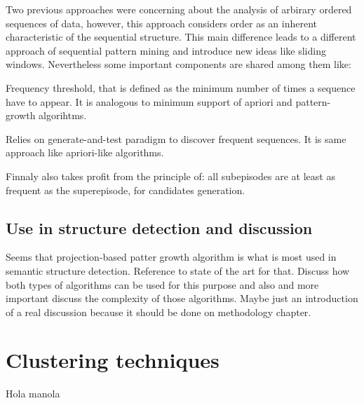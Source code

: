 Two previous approaches were concerning about the analysis of arbirary ordered
sequences of data, however, this approach considers order as an inherent
characteristic of the sequential structure. This main difference leads to a
different approach of sequential pattern mining and introduce new ideas like
sliding windows. Nevertheless some important components are shared among them like:
\begin{enumerate*}[label=(\roman*)]
  \item Frequency threshold, that is defined as the minimum number of times a
    sequence have to appear. It is analogous to minimum support of apriori and
    pattern-growth algorihtms.
  \item Relies on generate-and-test paradigm to discover frequent sequences. It
    is same approach like apriori-like algorithms.
  \item Finnaly also takes profit from the principle of: all subepisodes are at
    least as frequent as the superepisode, for candidates generation.
\end{enumerate*}

\subsection{Use in structure detection and discussion}

Seems that projection-based patter growth algorithm is what is most used in
semantic structure detection. Reference to state of the art for that. Discuss
how both types of algorithms can be used for this purpose and also and more
important discuss the complexity of those algorithms. Maybe just an introduction
of a real discussion because it should be done on methodology chapter.


\section{Clustering techniques}

Hola manola



